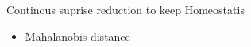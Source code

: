 \begin{frame}{Continous suprise reduction to keep Homeostatis}
    \begin{itemize}
        \item Mahalanobis distance
    \end{itemize}
\end{frame}